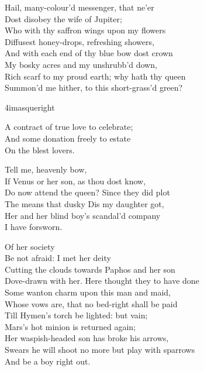 
\begin{verse_speech}[Ceres] 
Hail, many-colour'd messenger, that ne'er\\
Dost disobey the wife of Jupiter;\\
Who with thy saffron wings upon my flowers\\
Diffusest honey-drops, refreshing showers,\\
And with each end of thy blue bow dost crown\\
My bosky acres and my unshrubb'd down,\\
Rich scarf to my proud earth; why hath thy queen\\
Summon'd me hither, to this short-grass'd green?
\end{verse_speech}


	\begin{bwbigpic}
		[\picwidth]
		{4imasqueright}
		{}
	\end{bwbigpic}



\begin{verse_speech}[Iris] 
A contract of true love to celebrate;\\
And some donation freely to estate\\
On the blest lovers.
\end{verse_speech}

\begin{verse_speech}[Ceres] 
Tell me, heavenly bow,\\
If Venus or her son, as thou dost know,\\
Do now attend the queen? Since they did plot\\
The means that dusky Dis my daughter got,\\
Her and her blind boy's scandal'd company\\
I have forsworn.
\end{verse_speech}


\begin{verse_speech}[Iris] 
Of her society\\
Be not afraid: I met her deity\\
Cutting the clouds towards Paphos and her son\\
Dove-drawn with her. Here thought they to have done\\
Some wanton charm upon this man and maid,\\
Whose vows are, that no bed-right shall be paid\\
Till Hymen's torch be lighted: but vain;\\
Mars's hot minion is returned again;\\
Her waspish-headed son has broke his arrows,\\
Swears he will shoot no more but play with sparrows\\
And be a boy right out.
\end{verse_speech}


